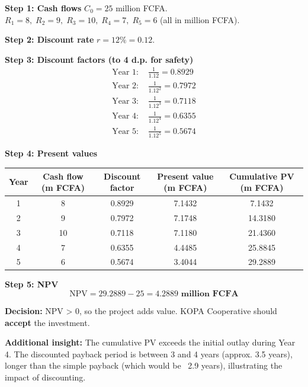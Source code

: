 \documentclass[11pt]{article}
\begin{document}
\begin{exoresolu}
\textbf{Step 1: Cash flows}
\(C_0 = 25\) million FCFA.
\(R_1=8,\; R_2=9,\; R_3=10,\; R_4=7,\; R_5=6\) (all in million FCFA).

\textbf{Step 2: Discount rate} \(r = 12\% = 0.12\).

\textbf{Step 3: Discount factors (to 4 d.p. for safety)}
\[
\begin{aligned}
\text{Year 1: } & \frac{1}{1.12} = 0.8929 \\
\text{Year 2: } & \frac{1}{1.12^2} = 0.7972 \\
\text{Year 3: } & \frac{1}{1.12^3} = 0.7118 \\
\text{Year 4: } & \frac{1}{1.12^4} = 0.6355 \\
\text{Year 5: } & \frac{1}{1.12^5} = 0.5674
\end{aligned}
\]

\textbf{Step 4: Present values}
\begin{center}
\begin{tabular}{|c|c|c|c|c|}
\hline
\rowcolor{popblueL}
Year & Cash flow (m FCFA) & Discount factor & Present value (m FCFA) & Cumulative PV (m FCFA) \\
\hline
1 & 8 & 0.8929 & 7.1432 & 7.1432 \\
2 & 9 & 0.7972 & 7.1748 & 14.3180 \\
3 & 10 & 0.7118 & 7.1180 & 21.4360 \\
4 & 7 & 0.6355 & 4.4485 & 25.8845 \\
5 & 6 & 0.5674 & 3.4044 & 29.2889 \\
\hline
\end{tabular}
\end{center}

\textbf{Step 5: NPV}
\[
\text{NPV} = 29.2889 - 25 = \mathbf{4.2889 \text{ million FCFA}}
\]

\textbf{Decision:} NPV > 0, so the project adds value. KOPA Cooperative should \textbf{accept} the investment.

\textbf{Additional insight:} The cumulative PV exceeds the initial outlay during Year 4. The discounted payback period is between 3 and 4 years (approx. 3.5 years), longer than the simple payback (which would be ~2.9 years), illustrating the impact of discounting.
\end{exoresolu}
\end{document}
